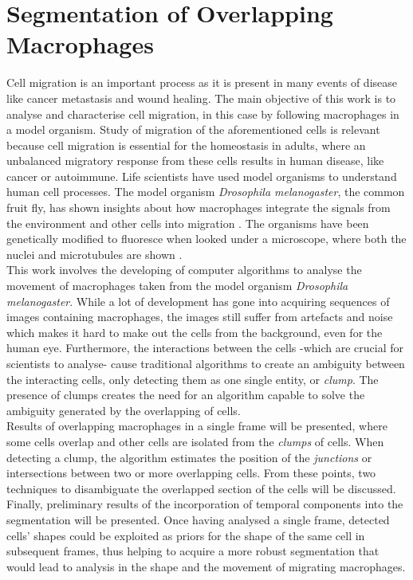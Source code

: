 \section*{Segmentation of Overlapping Macrophages}
%
Cell migration is an important process as it is present in many events of
disease like cancer metastasis and wound healing.
The main objective of this work is to analyse and characterise cell
migration, in this case by following macrophages in a model organism.
Study of migration of the aforementioned cells is relevant because
cell migration is essential for the homeostasis in adults\cite{pocha2014},
where an unbalanced migratory response from these cells results in
human disease, like cancer or autoimmune.
Life scientists have used model organisms to understand human cell processes.
The model organism \emph{Drosophila melanogaster}, the common fruit fly,
has shown insights about how macrophages integrate the signals
from the environment and other cells into migration \cite{wood2017}.
The organisms have been genetically modified to fluoresce
when looked under a microscope, where both the nuclei and
microtubules are shown \cite{Stramer2010}.
\medskip\\
%
This work involves the developing of computer algorithms to analyse the
movement of macro\-phages taken from the model organism
\emph{Drosophila melanogaster}. While a lot of development
has gone into acquiring sequences of images containing macrophages,
the images still suffer from artefacts and noise which makes it hard to
make out the cells from the background, even for the human eye.
Furthermore, the interactions between the cells
-which are crucial for scientists to analyse-
cause traditional algorithms\cite{Henry2013,lu2015,Caselles}
to create an ambiguity between the interacting cells, only detecting them
as one single entity, or \emph{clump}.
The presence of clumps creates the need for an algorithm capable to solve
the ambiguity generated by the overlapping of cells.
\medskip\\
%
Results of overlapping macrophages in a single frame will be
presented, where some cells overlap and other cells are
isolated from the \emph{clumps} of cells. When detecting a clump,
the algorithm estimates the position of the \emph{junctions} or intersections
between two or more overlapping cells. From these points, two techniques
to disambiguate the overlapped section of the cells will be discussed.
Finally, preliminary results of the incorporation of temporal components
into the segmentation will be presented. Once having analysed a single
frame, detected cells' shapes could be exploited as priors for the
shape of the same cell in subsequent frames, thus helping to acquire a
more robust segmentation that would lead to analysis in the shape and the
movement of migrating macrophages.
